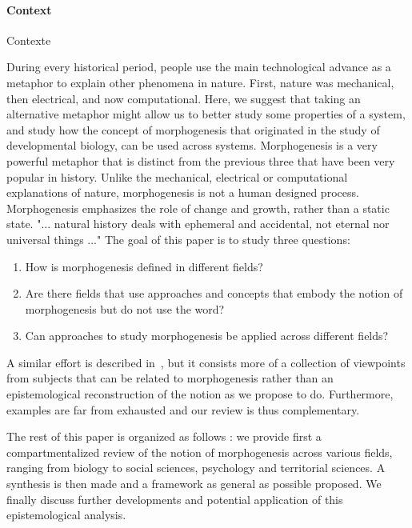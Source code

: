 \paragraph{Context}{Contexte}




During every historical period, people use the main technological advance as a metaphor to explain other phenomena in nature. First, nature was mechanical, then electrical, and now computational. Here, we suggest that taking an alternative metaphor might allow us to better study some properties of a system, and study how the concept of morphogenesis that originated in the study of developmental biology, can be used across systems. Morphogenesis is a very powerful metaphor that is distinct from the previous three that have been very popular in history. Unlike the mechanical, electrical or computational explanations of nature, morphogenesis is not a human designed process. Morphogenesis emphasizes the role of change and growth, rather than a static state. "... natural history deals with ephemeral and accidental, not eternal nor universal things ..." \cite{thompson1942growth} The goal of this paper is to study three questions: 
\begin{enumerate}
\item How is morphogenesis defined in different fields? 
\item Are there fields that use approaches and concepts that embody the notion of morphogenesis but do not use the word?
\item Can approaches to study morphogenesis be applied across different fields?
\end{enumerate}  A similar effort is described in~\cite{bourgine2010morphogenesis}, but it consists more of a collection of viewpoints from subjects that can be related to morphogenesis rather than an epistemological reconstruction of the notion as we propose to do. Furthermore, examples are far from exhausted and our review is thus complementary.

The rest of this paper is organized as follows : we provide first a compartmentalized review of the notion of morphogenesis across various fields, ranging from biology to social sciences, psychology and territorial sciences. A synthesis is then made and a framework as general as possible proposed. We finally discuss further developments and potential application of this epistemological analysis.


